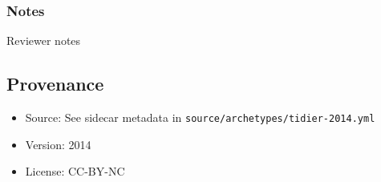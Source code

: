\documentclass[11pt]{article}
\def\tightlist{}
\begin{document}
\begin{Form}
\subsubsection{Notes}\label{notes}

{Reviewer notes}

\subsection{Provenance}\label{provenance}

\begin{itemize}
\tightlist
\item
  Source: See sidecar metadata in
  \texttt{source/archetypes/tidier-2014.yml}
\item
  Version: 2014
\item
  License: CC-BY-NC
\end{itemize}

\end{Form}
\end{document}
